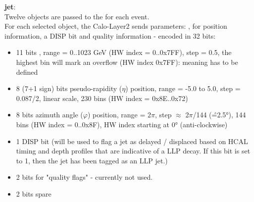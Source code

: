 \textbf{jet}:\\ Twelve objects are passed to the \ugt for each event.\\
For each selected object, the Calo-Layer2 sends parameters: \pt, for position information, a DISP bit and quality information - encoded in 32 bits:
\begin{itemize}
\item 11 bits \pt, range = 0..1023 GeV (HW index = 0..0x7FF), step = 0.5, the highest bin will mark an overflow (HW index 0x7FF): meaning has to be defined
\item 8 (7+1 sign) bits pseudo-rapidity ($\eta$) position, range = -5.0 to 5.0, step = 0.087/2, linear scale, 230 bins (HW index = 0x8E..0x72)
\item 8 bits azimuth angle ($\varphi$) position, range = 2$\pi$, step $\approx$ 2$\pi$/144 (\^=2.5°), 144 bins (HW index = 0..0x8F), HW index starting at 0° (anti-clockwise)
\item 1 DISP bit (will be used to flag a jet as delayed / displaced based on HCAL timing and depth profiles that are indicative of a LLP decay. If this bit is set to 1, then the jet has been tagged as an LLP jet.)
\item 2 bits for "quality flags" - currently not used.
\item 2 bits spare
\end{itemize}


